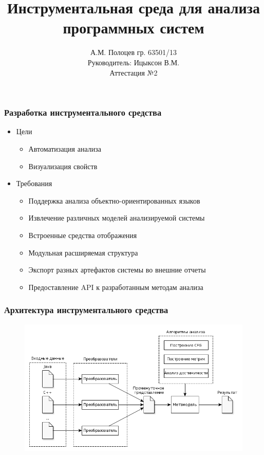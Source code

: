 \documentclass{beamer}
\title[Инструментальная среда]
{Инструментальная среда для анализа программных систем}
\author[А.М. Полоцев]{
    А.М. Полоцев гр. 63501/13\\
    Руководитель: Ицыксон В.М.\\
    Аттестация №2
}
\date[20.12.2013]{}
\begin{document}
\frame{\titlepage}

\begin{frame}
\frametitle{Разработка инструментального средства}

\begin{itemize}
    \item Цели
        \begin{itemize}
            \item Автоматизация анализа
            \item Визуализация свойств
        \end{itemize}
    \item Требования
        \begin{itemize}
            \item Поддержка анализа объектно-ориентированных языков
            \item Извлечение различных моделей анализируемой системы
            \item Встроенные средства отображения
            \item Модульная расширяемая структура
            \item Экспорт разных артефактов системы во внешние отчеты
            \item Предоставление API к разработанным методам анализа
        \end{itemize}
\end{itemize}
\end{frame}

\begin{frame}
\frametitle{Архитектура инструментального средства}

\begin{figure}[h!]
    \begin{center}
        \includegraphics[width=\textwidth]{img/architecture.png}
    \end{center}
\end{figure}
\end{frame}
\end{document}
